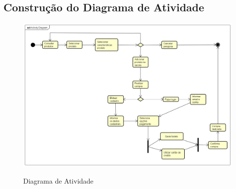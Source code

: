 \subsection{Construção do Diagrama de Atividade}
\label{sec:diaati}

\begin{figure}[H]
    \centering
    \caption{Diagrama de Atividade}
    \includegraphics[width=1.0\textwidth]{./dados/figuras/6}
    \label{fig:figura-1}
\end{figure}

